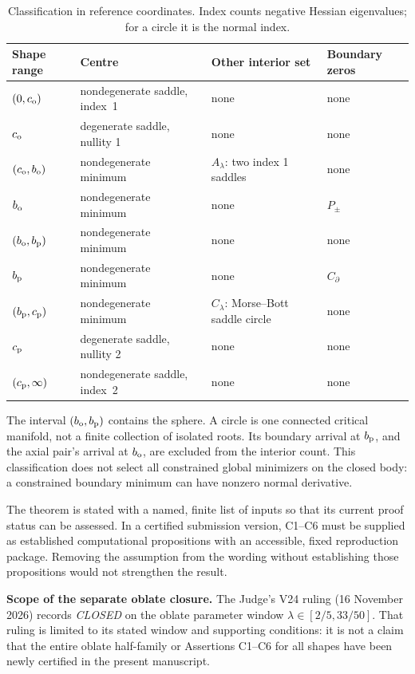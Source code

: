 \begin{table}[htbp]\centering\small
\caption{Classification in reference coordinates. Index counts negative Hessian eigenvalues; for a circle it is the normal index.}\label{tab:classification}
\begin{tabularx}{\linewidth}{@{}lXXX@{}}\toprule
Shape range & Centre & Other interior set & Boundary zeros\\\midrule
$(0,c_{\mathrm o})$ & nondegenerate saddle, \mbox{index 1} & none & none\\
$c_{\mathrm o}$ & degenerate saddle, nullity 1 & none & none\\
$(c_{\mathrm o},b_{\mathrm o})$ & nondegenerate minimum & $A_\lambda$: two index 1 saddles & none\\
$b_{\mathrm o}$ & nondegenerate minimum & none & $P_\pm$\\
$(b_{\mathrm o},b_{\mathrm p})$ & nondegenerate minimum & none & none\\
$b_{\mathrm p}$ & nondegenerate minimum & none & $C_\partial$\\
$(b_{\mathrm p},c_{\mathrm p})$ & nondegenerate minimum & $C_\lambda$: Morse--Bott saddle circle & none\\
$c_{\mathrm p}$ & degenerate saddle, nullity 2 & none & none\\
$(c_{\mathrm p},\infty)$ & nondegenerate saddle, \mbox{index 2} & none & none\\\bottomrule
\end{tabularx}
\end{table}

The interval $(b_{\mathrm o},b_{\mathrm p})$ contains the sphere. A circle is one connected critical manifold, not a finite collection of isolated roots. Its boundary arrival at $b_{\mathrm p}$, and the axial pair's arrival at $b_{\mathrm o}$, are excluded from the interior count. This classification does not select all constrained global minimizers on the closed body: a constrained boundary minimum can have nonzero normal derivative.

The theorem is stated with a named, finite list of inputs so that its current proof status can be assessed. In a certified submission version, C1--C6 must be supplied as established computational propositions with an accessible, fixed reproduction package. Removing the assumption from the wording without establishing those propositions would not strengthen the result.

\noindent\textbf{Scope of the separate oblate closure.}
The Judge's V24 ruling (16 November 2026) records \emph{CLOSED} on the
oblate parameter window $\lambda\in[2/5,33/50]$.
That ruling is limited to its stated window and supporting conditions:
it is not a claim that the entire oblate half-family or Assertions C1--C6
for all shapes have been newly certified in the present manuscript.

